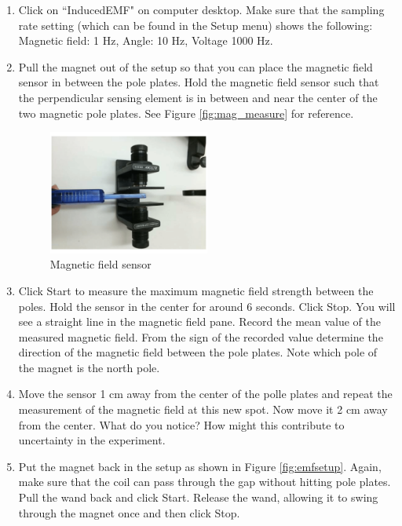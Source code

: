 \begin{enumerate}
 \item Click on ``InducedEMF" on computer desktop. Make sure that the sampling rate setting (which can be found in the Setup menu) shows the following: Magnetic field: 1 Hz, Angle: 10 Hz, Voltage 1000 Hz.

 \item Pull the magnet out of the setup so that you can place the magnetic field sensor in between the pole plates. Hold the magnetic field sensor such that the perpendicular sensing element is in between and near the center of the two magnetic pole plates. See Figure \ref{fig:mag_measure} for reference.

 \begin{figure}[h]
 \centering
 \includegraphics[width=0.5\textwidth]{./Exp4/pic/mag_measure.png}
 \caption{Magnetic field sensor}
 \label{fig:mag_sensor}
 \end{figure}

 \item Click Start to measure the maximum magnetic field strength between the poles. Hold the sensor in the center for around 6 seconds. Click Stop. You will see a straight line in the magnetic field pane. Record the mean value of the measured magnetic field. From the sign of the recorded value determine the direction of the magnetic field between the pole plates. Note which pole of the magnet is the north pole.

 \item Move the sensor 1 cm away from the center of the polle plates and repeat the measurement of the magnetic field at this new spot. Now move it 2 cm away from the center. What do you notice? How might this contribute to uncertainty in the experiment.

 \item Put the magnet back in the setup as shown in Figure \ref{fig:emfsetup}. Again, make sure that the coil can pass through the gap without hitting pole plates. Pull the wand back and click Start. Release the wand, allowing it to swing through the magnet once and then click Stop.


\end{enumerate}

